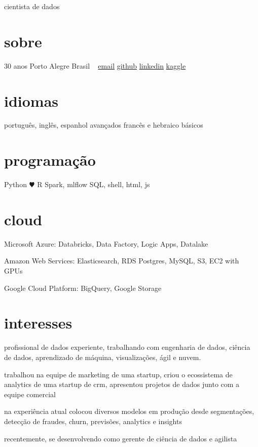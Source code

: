 \documentclass[]{friggeri-cv}
\begin{document}
       {cientista de dados}


\begin{aside}
  \section{sobre}
    30 anos
    Porto Alegre
    Brasil
    ~
    \href{mailto:jayme.anchante@disroot.org}{email}
    \href{https://github.com/jaymeanchante/}{github}
    \href{https://www.linkedin.com/in/jaymeanchante}{linkedin}
    \href{https://www.kaggle.com/jaymeanchante}{kaggle}
  \section{idiomas}
    português, inglês, espanhol avançados
    francês e hebraico básicos
  \section{programação}
    Python {\color{red} $\varheartsuit$} R
    Spark, mlflow
    SQL, shell, html, js
  \section{cloud}
  \hfill \break Microsoft Azure:
  Databricks, Data Factory, Logic
  Apps, Datalake
  
  \hfill \break Amazon Web Services:
  Elasticsearch, RDS Postgres, MySQL,
  S3, EC2 with GPUs
  
  \hfill \break Google Cloud Platform:
  BigQuery, Google Storage
\end{aside}

\section{interesses}

profissional de dados experiente, trabalhando com engenharia de dados, ciência de dados,
aprendizado de máquina, visualizações, ágil e nuvem.

trabalhou na equipe de marketing de uma startup, criou o ecossistema de analytics
de uma startup de crm, apresentou projetos de dados junto com a equipe comercial

na experiência atual colocou diversos modelos em produção desde
segmentações, detecção de fraudes, churn, previsões, analytics e insights

recentemente, se desenvolvendo como gerente de ciência de dados e agilista
\end{document}
